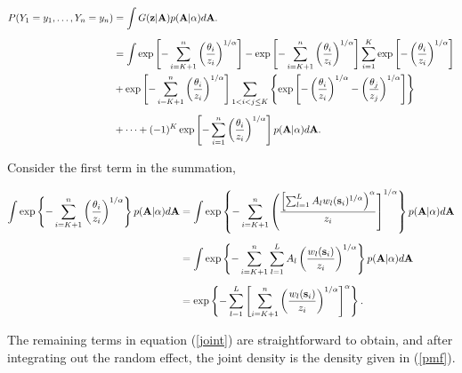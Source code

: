 \documentclass[11pt]{article}
\newcommand{\bA}{ \mbox{\bf A}}
\newcommand{\bz}{ \mbox{\bf z}}
\newcommand{\bs}{ \mbox{\bf s}}
\begin{document}
\begin{align} \label{joint}
    P(Y_1=y_1,\ldots,Y_n=y_n) &=\int G(\bz | \bA) p( \bA | \alpha) d\bA. \nonumber\\[0.5em]
			&= \int \exp \left[ -\sum_{ i = K+1}^{ n }\left( \frac{ \theta_i }{ z_i } \right)^{1/\alpha} \right] - \exp \left[ -\sum_{ i = K+1}^{ n }\left( \frac{ \theta_i }{ z_i } \right)^{1/\alpha} \right] \sum_{ i = 1}^{K} \exp\left[ -\left( \frac{ \theta_i }{ z_i } \right)^{ 1/\alpha} \right] \nonumber\\
		&  + \exp \left[ -\sum_{ i = K+1}^{ n }\left( \frac{ \theta_i }{ z_i } \right)^{1/\alpha} \right] \sum_{ 1 < i < j \le K } \left\{ \exp \left[ - \left( \frac{ \theta_i }{ z_i } \right)^{ 1/\alpha} - \left( \frac{ \theta_j }{ z_j } \right)^{ 1/\alpha } \right] \right \} \nonumber \\[0.5em]
		& + \cdots + (-1)^K \exp\left[ - \sum_{ i = 1 }^{ n }\left( \frac{ \theta_i }{ z_i } \right)^{ 1/\alpha} \right] p( \bA | \alpha) d\bA.
\end{align}

Consider the first term in the summation,

\begin{align}
	\int \exp \left\{ -\sum_{ i = K+1}^{ n }\left( \frac{ \theta_i }{ z_i } \right)^{1/\alpha} \right\} p( \bA | \alpha) d\bA &= \int \exp \left\{ - \sum_{ i = K + 1 }^n \left( \frac{ \left[ \sum_{ l = 1 }^L  A_l w_{l}(\bs_i)^{1/\alpha} \right)^\alpha }{ z_i} \right]^{ 1/\alpha } \right \} p( \bA | \alpha) d\bA \nonumber \\[0.5em]
	 &= \int \exp \left\{ -\sum_{ i = K + 1}^n \sum_{ l = 1}^L A_l \left( \frac{ w_l (\bs_i) }{ z_i } \right)^{1/\alpha} \right \} p( \bA | \alpha) d\bA \nonumber \\[0.5em]
	 &=\exp\left\{-\sum_{ l = 1}^L \left[ \sum_{ i = K + 1 }^n \left( \frac{ w_l(\bs_i)}{ z_i} \right)^{1/\alpha} \right]^\alpha \right\}.
\end{align}

The remaining terms in equation (\ref{joint}) are straightforward to obtain, and after integrating out the random effect, the joint density is the density given in (\ref{pmf}).
\end{document}
